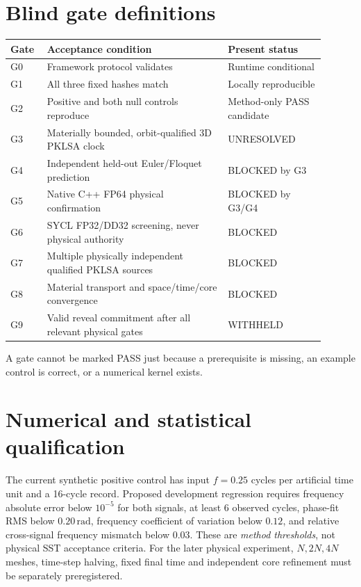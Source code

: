 \documentclass[11pt,a4paper]{article}
\begin{document}
\section{Blind gate definitions}
\begin{longtable}{p{0.10\linewidth}p{0.52\linewidth}p{0.28\linewidth}}
\toprule Gate & Acceptance condition & Present status\\\midrule
G0 & Framework protocol validates & Runtime conditional\\
G1 & All three fixed hashes match & Locally reproducible\\
G2 & Positive and both null controls reproduce & Method-only PASS candidate\\
G3 & Materially bounded, orbit-qualified 3D PKLSA clock & UNRESOLVED\\
G4 & Independent held-out Euler/Floquet prediction & BLOCKED by G3\\
G5 & Native C++ FP64 physical confirmation & BLOCKED by G3/G4\\
G6 & SYCL FP32/DD32 screening, never physical authority & BLOCKED\\
G7 & Multiple physically independent qualified PKLSA sources & BLOCKED\\
G8 & Material transport and space/time/core convergence & BLOCKED\\
G9 & Valid reveal commitment after all relevant physical gates & WITHHELD\\\bottomrule
\end{longtable}
A gate cannot be marked PASS just because a prerequisite is missing, an example control is correct, or a numerical kernel exists.

\section{Numerical and statistical qualification}
The current synthetic positive control has input $f=0.25$ cycles per artificial time unit and a 16-cycle record. Proposed development regression requires frequency absolute error below $10^{-5}$ for both signals, at least 6 observed cycles, phase-fit RMS below $0.20\,\mathrm{rad}$, frequency coefficient of variation below $0.12$, and relative cross-signal frequency mismatch below $0.03$. These are \emph{method thresholds}, not physical SST acceptance criteria. For the later physical experiment, $N,2N,4N$ meshes, time-step halving, fixed final time and independent core refinement must be separately preregistered.
\end{document}
